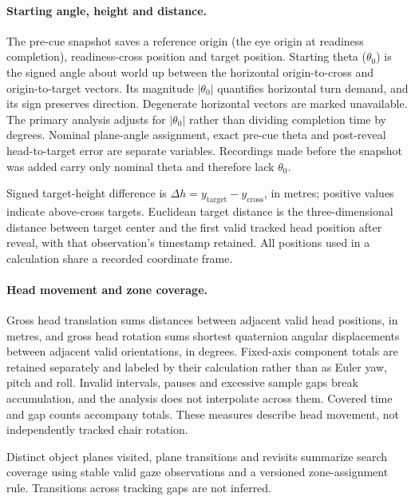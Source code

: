 \paragraph{Starting angle, height and distance.} The pre-cue snapshot saves a reference origin (the eye origin at readiness completion), readiness-cross position and target position. Starting theta ($\theta_0$) is the signed angle about world up between the horizontal origin-to-cross and origin-to-target vectors. Its magnitude $|\theta_0|$ quantifies horizontal turn demand, and its sign preserves direction. Degenerate horizontal vectors are marked unavailable. The primary analysis adjusts for $|\theta_0|$ rather than dividing completion time by degrees. Nominal plane-angle assignment, exact pre-cue theta and post-reveal head-to-target error are separate variables. Recordings made before the snapshot was added carry only nominal theta and therefore lack $\theta_0$.

Signed target-height difference is $\Delta h=y_{\mathrm{target}}-y_{\mathrm{cross}}$, in metres; positive values indicate above-cross targets. Euclidean target distance is the three-dimensional distance between target center and the first valid tracked head position after reveal, with that observation's timestamp retained. All positions used in a calculation share a recorded coordinate frame.

\paragraph{Head movement and zone coverage.} Gross head translation sums distances between adjacent valid head positions, in metres, and gross head rotation sums shortest quaternion angular displacements between adjacent valid orientations, in degrees. Fixed-axis component totals are retained separately and labeled by their calculation rather than as Euler yaw, pitch and roll. Invalid intervals, pauses and excessive sample gaps break accumulation, and the analysis does not interpolate across them. Covered time and gap counts accompany totals. These measures describe head movement, not independently tracked chair rotation.

Distinct object planes visited, plane transitions and revisits summarize search coverage using stable valid gaze observations and a versioned zone-assignment rule. Transitions across tracking gaps are not inferred.

